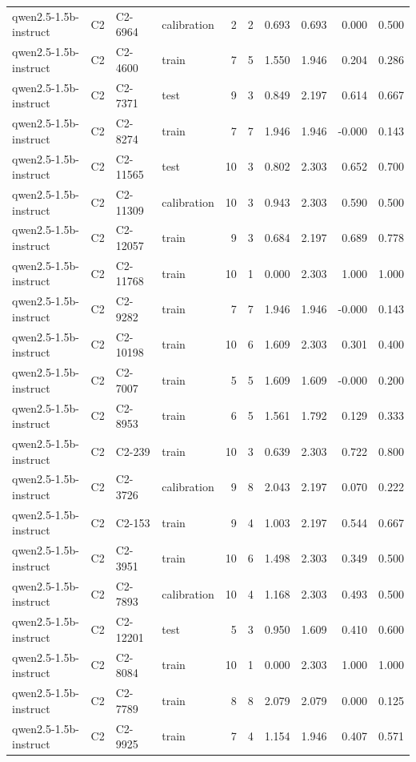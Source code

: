 \begin{table}
\begin{tabular}{llllrrrrrr}
qwen2.5-1.5b-instruct & C2 & C2-6964 & calibration & 2 & 2 & 0.693 & 0.693 & 0.000 & 0.500 \\
qwen2.5-1.5b-instruct & C2 & C2-4600 & train & 7 & 5 & 1.550 & 1.946 & 0.204 & 0.286 \\
qwen2.5-1.5b-instruct & C2 & C2-7371 & test & 9 & 3 & 0.849 & 2.197 & 0.614 & 0.667 \\
qwen2.5-1.5b-instruct & C2 & C2-8274 & train & 7 & 7 & 1.946 & 1.946 & -0.000 & 0.143 \\
qwen2.5-1.5b-instruct & C2 & C2-11565 & test & 10 & 3 & 0.802 & 2.303 & 0.652 & 0.700 \\
qwen2.5-1.5b-instruct & C2 & C2-11309 & calibration & 10 & 3 & 0.943 & 2.303 & 0.590 & 0.500 \\
qwen2.5-1.5b-instruct & C2 & C2-12057 & train & 9 & 3 & 0.684 & 2.197 & 0.689 & 0.778 \\
qwen2.5-1.5b-instruct & C2 & C2-11768 & train & 10 & 1 & 0.000 & 2.303 & 1.000 & 1.000 \\
qwen2.5-1.5b-instruct & C2 & C2-9282 & train & 7 & 7 & 1.946 & 1.946 & -0.000 & 0.143 \\
qwen2.5-1.5b-instruct & C2 & C2-10198 & train & 10 & 6 & 1.609 & 2.303 & 0.301 & 0.400 \\
qwen2.5-1.5b-instruct & C2 & C2-7007 & train & 5 & 5 & 1.609 & 1.609 & -0.000 & 0.200 \\
qwen2.5-1.5b-instruct & C2 & C2-8953 & train & 6 & 5 & 1.561 & 1.792 & 0.129 & 0.333 \\
qwen2.5-1.5b-instruct & C2 & C2-239 & train & 10 & 3 & 0.639 & 2.303 & 0.722 & 0.800 \\
qwen2.5-1.5b-instruct & C2 & C2-3726 & calibration & 9 & 8 & 2.043 & 2.197 & 0.070 & 0.222 \\
qwen2.5-1.5b-instruct & C2 & C2-153 & train & 9 & 4 & 1.003 & 2.197 & 0.544 & 0.667 \\
qwen2.5-1.5b-instruct & C2 & C2-3951 & train & 10 & 6 & 1.498 & 2.303 & 0.349 & 0.500 \\
qwen2.5-1.5b-instruct & C2 & C2-7893 & calibration & 10 & 4 & 1.168 & 2.303 & 0.493 & 0.500 \\
qwen2.5-1.5b-instruct & C2 & C2-12201 & test & 5 & 3 & 0.950 & 1.609 & 0.410 & 0.600 \\
qwen2.5-1.5b-instruct & C2 & C2-8084 & train & 10 & 1 & 0.000 & 2.303 & 1.000 & 1.000 \\
qwen2.5-1.5b-instruct & C2 & C2-7789 & train & 8 & 8 & 2.079 & 2.079 & 0.000 & 0.125 \\
qwen2.5-1.5b-instruct & C2 & C2-9925 & train & 7 & 4 & 1.154 & 1.946 & 0.407 & 0.571 \\

\end{tabular}
\end{table}
